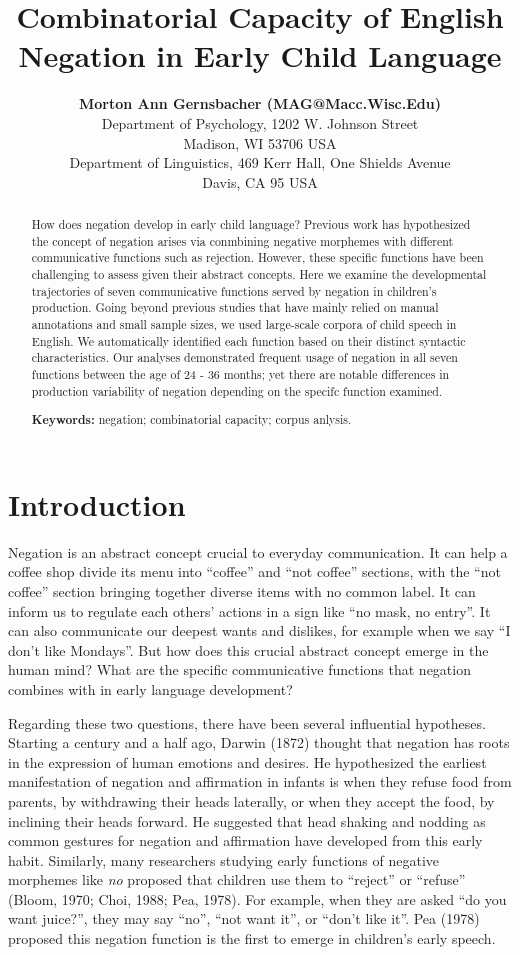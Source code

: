 \documentclass[10pt, letterpaper]{article}
\title{Combinatorial Capacity of English Negation in Early Child Language}
\author{{\large \bf Morton Ann Gernsbacher (MAG@Macc.Wisc.Edu)} \\ Department of Psychology, 1202 W. Johnson Street \\ Madison, WI 53706 USA \AND {\large \bf Masoud Jasbi (jasbi@ucdavis.edu)} \\ Department of Linguistics, 469 Kerr Hall, One Shields Avenue \\ Davis, CA 95 USA}
\begin{document}
\maketitle

\begin{abstract}
How does negation develop in early child language? Previous work has
hypothesized the concept of negation arises via conmbining negative
morphemes with different communicative functions such as rejection.
However, these specific functions have been challenging to assess given
their abstract concepts. Here we examine the developmental trajectories
of seven communicative functions served by negation in children's
production. Going beyond previous studies that have mainly relied on
manual annotations and small sample sizes, we used large-scale corpora
of child speech in English. We automatically identified each function
based on their distinct syntactic characteristics. Our analyses
demonstrated frequent usage of negation in all seven functions between
the age of 24 - 36 months; yet there are notable differences in
production variability of negation depending on the specifc function
examined.

\textbf{Keywords:}
negation; combinatorial capacity; corpus anlysis.
\end{abstract}

\hypertarget{introduction}{%
\section{Introduction}\label{introduction}}

Negation is an abstract concept crucial to everyday communication. It
can help a coffee shop divide its menu into ``coffee'' and ``not
coffee'' sections, with the ``not coffee'' section bringing together
diverse items with no common label. It can inform us to regulate each
others' actions in a sign like ``no mask, no entry''. It can also
communicate our deepest wants and dislikes, for example when we say ``I
don't like Mondays''. But how does this crucial abstract concept emerge
in the human mind? What are the specific communicative functions that
negation combines with in early language development?

Regarding these two questions, there have been several influential
hypotheses. Starting a century and a half ago, Darwin (1872) thought
that negation has roots in the expression of human emotions and desires.
He hypothesized the earliest manifestation of negation and affirmation
in infants is when they refuse food from parents, by withdrawing their
heads laterally, or when they accept the food, by inclining their heads
forward. He suggested that head shaking and nodding as common gestures
for negation and affirmation have developed from this early habit.
Similarly, many researchers studying early functions of negative
morphemes like \emph{no} proposed that children use them to ``reject''
or ``refuse'' (Bloom, 1970; Choi, 1988; Pea, 1978). For example, when
they are asked ``do you want juice?'', they may say ``no'', ``not want
it'', or ``don't like it''. Pea (1978) proposed this negation function
is the first to emerge in children's early speech.
\end{document}
